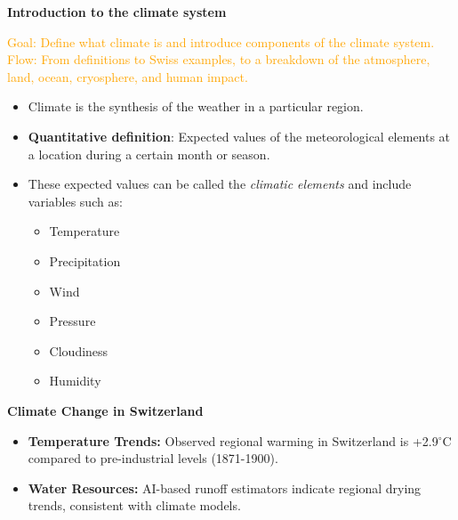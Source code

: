 \documentclass[fontsize=8pt, a4paper, landscape, fleqn]{scrartcl}
\renewcommand{\section}[1]{%
    \noindent\colorbox{sectioncolor}{%
        \parbox{\dimexpr\columnwidth-2\fboxsep}{\color{white}\textbf{#1}}}%
    \vspace{0.5mm}%
}
\renewcommand{\subsection}[1]{%
    \noindent\colorbox{subsectioncolor}{%
        \parbox{\dimexpr\columnwidth-2\fboxsep}{\color{white}\textbf{#1}}}%
    \vspace{0.5mm}%
}
\begin{document}
\begin{multicols*}{3}[\raggedcolumns]





\section{Introduction to the climate system}
\noindent\textcolor{orange}{ Goal: Define what climate is and introduce components of the climate system.\\
Flow: From definitions to Swiss examples, to a breakdown of the atmosphere, land, ocean, cryosphere, and human impact.
}
\begin{itemize}
    \item Climate is the synthesis of the weather in a particular region.
    \item \textbf{Quantitative definition}: Expected values of the meteorological elements at a location during a certain month or season.
    \item These expected values can be called the \textit{climatic elements} and include variables such as:
    \begin{itemize}
        \item Temperature
        \item Precipitation
        \item Wind
        \item Pressure
        \item Cloudiness
        \item Humidity
    \end{itemize}
\end{itemize}

\subsection{Climate Change in Switzerland}
\begin{itemize}
    \item \textbf{Temperature Trends:} Observed regional warming in Switzerland is +2.9$^{\circ}$C compared to pre-industrial levels (1871-1900).
    \item \textbf{Water Resources:} AI-based runoff estimators indicate regional drying trends, consistent with climate models.
\end{itemize}


\end{multicols*}
\end{document}
